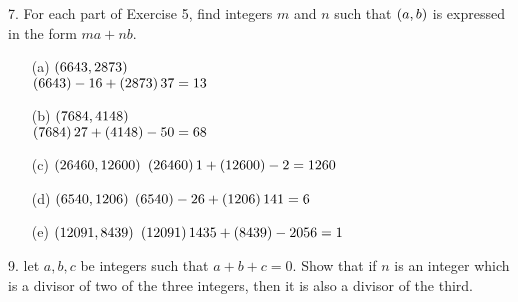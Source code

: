 \newpage
\begin{mdframed}[style=darkQuesion]
    7.    For each part of Exercise 5, find integers $m$ and $n$ such that 
$\left(a,b\right)$ is expressed in the form $ma+nb$. 

\end{mdframed}

\begin{mdframed}[style=darkAnswer,frametitle={Joe Starr}]
\begin{itemize}
    \item [(a)] {$\left(6643,2873\right)$\\
        $\left(6643\right)-16+\left(2873\right)37=13$
    }
    \item [(b)] {$\left(7684,4148\right)$\\
    $\left(7684\right)27+\left(4148\right)-50=68$
    }
    \item [(c)] {$\left(26460,12600\right)$
    $\left(26460\right)1+\left(12600\right)-2=1260$
    }
    \item [(d)] {$\left(6540,1206\right)$
   $\left(6540\right)-26+\left(1206\right)141=6$
    }
    \item [(e)] {$\left(12091,8439\right)$
    $\left(12091\right)1435+\left(8439\right)-2056=1$
    }
\end{itemize}
\end{mdframed}
\newpage
\begin{mdframed}[style=darkQuesion]
9.  let $a,b,c$ be integers such that $a+b+c=0$. Show that if $n$ is an integer
which is a divisor of two of the three integers, then it is also a divisor of 
the third. 

\end{mdframed}

